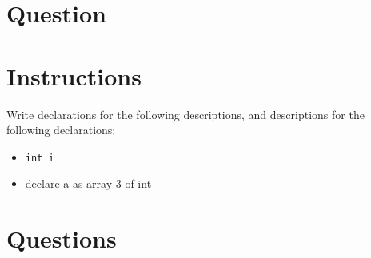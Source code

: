 




\docCopyright

\section{Question}

\section*{Instructions}

{
  \long{}
  Write declarations for the following descriptions, and descriptions for the
  following declarations:
  \begin{itemize}
    \item \texttt{int i}
    \item declare a as array 3 of int
  \end{itemize}
}

\section*{Questions}


